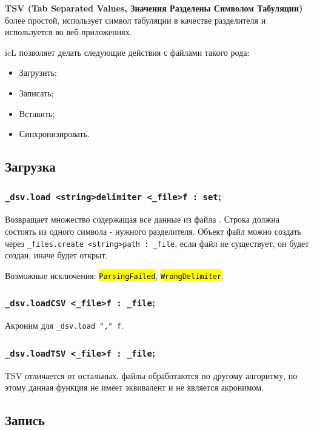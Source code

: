 \documentclass[a4paper, 14pt]{extarticle}
\newcommand{\ferror}[1]{{\fontsize{11pt}{12pt}\tt{\sethlcolor{yellow}\hl{#1}}}}
\newenvironment{icItems}
	{ \begin{itemize} [noitemsep,nolistsep] }
	{ \end{itemize} }
\begin{document}
{\bf TSV (Tab Separated Values, Значения Разделены Символом Табуляции)} более простой, использует символ табуляции в качестве разделителя и используется во веб-приложениях.

icL позволяет делать следующие действия с файлами такого рода:
\begin{icItems}
	\item Загрузить;
	\item Записать;
	\item Вставить;
	\item Синхронизировать.
\end{icItems}

\subsection{Загрузка}

\subsubsection{\lstinline|_dsv.load <string>delimiter <_file>f : set|;}

Возвращает множество содержащая все данные из файла . Строка  должна состоять из одного символа - нужного разделителя. Объект файл можно создать через \lstinline|_files.create <string>path : _file|, если файл не существует, он будет создан, иначе будет открыт.

Возможные исключения: \ferror{ParsingFailed}, \ferror{WrongDelimiter}.

\subsubsection{\lstinline|_dsv.loadCSV <_file>f : _file|;}

Акроним для \lstinline|_dsv.load "," f|.

\subsubsection{\lstinline|_dsv.loadTSV <_file>f : _file|;}

TSV отличается от остальных, файлы обработаются по другому алгоритму, по этому данная функция не имеет эквивалент и не является акронимом.

\subsection{Запись}
\end{document}
